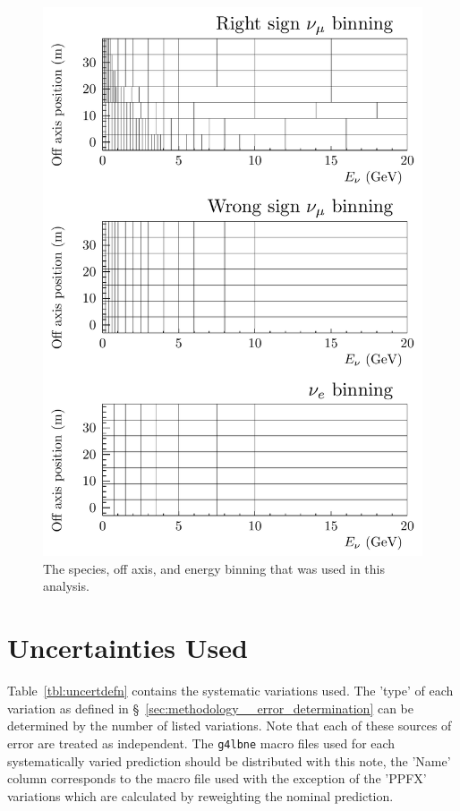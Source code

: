 \documentclass{article}
\begin{document}
\begin{figure}
  \includegraphics[width=\textwidth]{plots/Binning}
  \caption{The species, off axis, and energy binning that was used in this analysis.}
  \label{fig:binning}
\end{figure}

\section{Uncertainties Used}
\label{sec:uncertainties_used}
Table~\ref{tbl:uncertdefn} contains the systematic variations used. The 'type' of each variation as defined in \S~\ref{sec:methodology__error_determination} can be determined by the number of listed variations. Note that each of these sources of error are treated as independent. The \texttt{g4lbne} macro files used for each systematically varied prediction should be distributed with this note, the 'Name' column corresponds to the macro file used with the exception of the 'PPFX' variations which are calculated by reweighting the nominal prediction.
\end{document}
